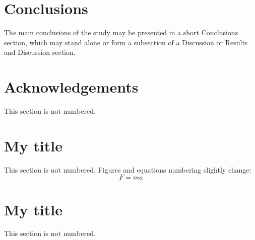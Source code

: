 \documentclass[]{IAC_style}
\begin{document}
\section{Conclusions}
The main conclusions of the study may be presented in a short Conclusions section, which may stand alone or form a subsection of a Discussion or Results and Discussion section.

\section*{Acknowledgements}
This section is not numbered.


\begin{appendices}
\section{My title}
This section is not numbered. Figures and equations numbering slightly change:
\begin{equation}
F = ma
\end{equation}


\section{My title}
This section is not numbered.
\end{appendices}




\end{document}
